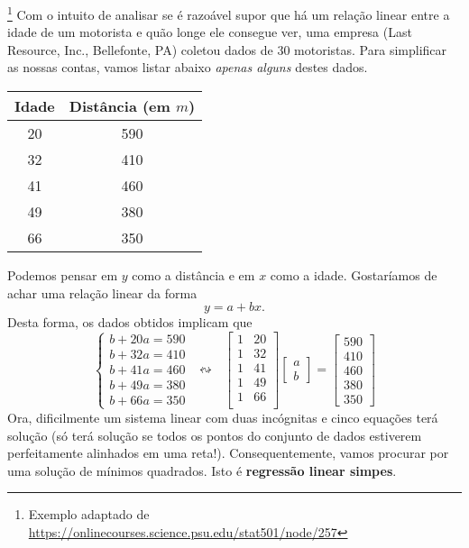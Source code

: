 \documentclass[../livro.tex]{subfiles}  %
\begin{document}
\begin{example}\footnote{Exemplo adaptado de \url{https://onlinecourses.science.psu.edu/stat501/node/257}}\label{exp:idade}
Com o intuito de analisar se é razoável supor que há um relação linear entre a idade de um motorista e quão longe ele consegue ver, uma empresa (Last Resource, Inc., Bellefonte, PA) coletou dados de 30 motoristas. Para simplificar as nossas contas, vamos listar abaixo \textit{apenas alguns} destes dados.
\begin{center}
 \begin{tabular}{|c|c|}
      \hline
      Idade & Distância (em $m$) \\ \hline
      20 & 590 \\
      32 & 410 \\
      41 & 460 \\
      49 & 380 \\
      66 & 350 \\
      \hline
  \end{tabular}
\end{center} Podemos pensar em $y$ como a distância e em $x$ como a idade. Gostaríamos de achar uma relação linear da forma
\begin{equation}
  y = a + b x.
\end{equation} Desta forma, os dados obtidos implicam que  
\begin{equation}
\left\{
    \begin{array}{ll}
      b + 20 a = 590 \\
      b + 32 a = 410 \\
      b + 41 a = 460 \\
      b + 49 a = 380 \\
      b + 66 a = 350
    \end{array}
  \right. \ \ \leftrightsquigarrow \ \ \
  \begin{bmatrix}
    1 & 20 \\
    1 & 32 \\
    1 & 41 \\
    1 & 49 \\
    1 & 66 \\
  \end{bmatrix}
  \begin{bmatrix}
    a \\ b
  \end{bmatrix} =
  \begin{bmatrix}
    590 \\ 410 \\ 460 \\ 380 \\ 350
  \end{bmatrix}
  \end{equation} Ora, dificilmente um sistema linear com duas incógnitas e cinco equações terá solução (só terá solução se todos os pontos do conjunto de dados estiverem perfeitamente alinhados em uma reta!). Consequentemente, vamos procurar por uma solução de mínimos quadrados. Isto é \textbf{regressão linear simpes}.


\end{example}
\end{document}
